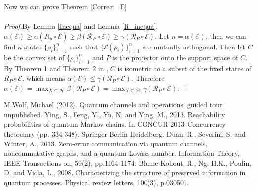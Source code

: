 \documentclass{article}
\def\R{\ensuremath{\mathfrak{R}}}
\def\E{\mathcal{E}}
\def\H{\mathcal{H}}
\def\R{\mathcal{R}}
\begin{document}
Now we can prove Theorem \ref{Correct_E}\\\\
{\it Proof.}By Lemma \ref{Inequa} and Lemma \ref{R_inequa}, $\alpha(\E)\geq\alpha(R_{p}\circ \E)\geq \beta(\R_{P}\circ\E)\geq\gamma(\R_{P}\circ\E)$. Let $n=\alpha(\E)$, then we can find $n$ states $\{\rho_{i}\}_{i=1}^{n}$ such that $\{\E(\rho_{i})\}_{i=1}^{n}$ are mutually orthogonal. Then let $C$ be the convex set of $\{\rho_{i}\}_{i=1}^{n}$ and $P$ is the projector onto the support space of $C$. By Theorem 1 and Theorem 2 in \cite{blume2008characterizing}, $C$ is isometric to a subset of the fixed states of $R_{P}\circ \E$, which means $\alpha(\E)\leq \gamma(\R_{P}\circ\E)$. Therefore $\alpha(\E)=\max_{X\subseteq\H} \beta(\R_{P}\circ\E)=\max_{X\subseteq\H} \gamma(\R_{P}\circ\E)$. 
\hfill $\Box$
\begin{thebibliography}{5}
M.Wolf, Michael (2012). Quantum channels and operations: guided tour. unpublished.
Ying, S., Feng, Y., Yu, N. and Ying, M., 2013. Reachability probabilities of quantum Markov chains. In CONCUR 2013–Concurrency theoremry (pp. 334-348). Springer Berlin Heidelberg.
Duan, R., Severini, S. and Winter, A., 2013. Zero-error communication via quantum channels, noncommutative graphs, and a quantum Lovász number. Information Theory, IEEE Transactions on, 59(2), pp.1164-1174.
Blume-Kohout, R., Ng, H.K., Poulin, D. and Viola, L., 2008. Characterizing the structure of preserved information in quantum processes. Physical review letters, 100(3), p.030501.
\end{thebibliography}
\end{document}
